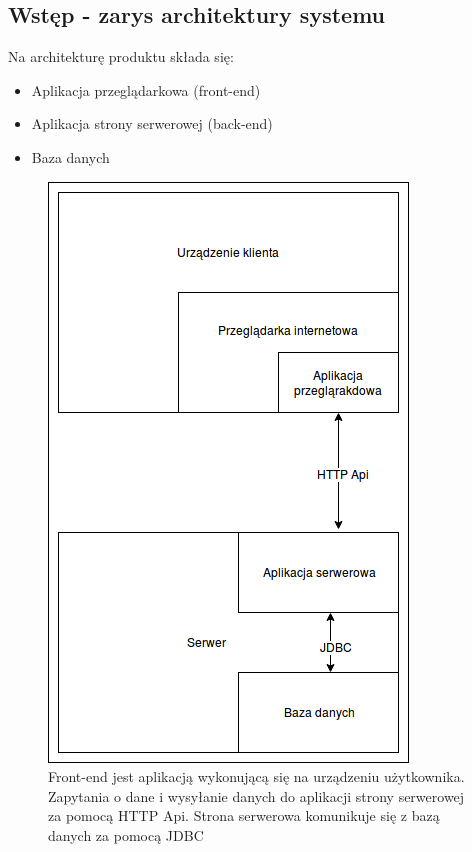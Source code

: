 \documentclass[polish,12pt]{aghthesis}
\begin{document}
\subsection{Wstęp - zarys architektury systemu}
Na architekturę produktu składa się:
\begin{itemize}
    \item Aplikacja przeglądarkowa (front-end)
    \item Aplikacja strony serwerowej (back-end)
    \item Baza danych
\end{itemize}


\begin{figure}[H]
    \centering
    \includegraphics{komunikacja-serwer-klient-okolny}
    \caption{Front-end jest aplikacją wykonującą się na urządzeniu użytkownika. Zapytania o dane i wysyłanie danych do aplikacji strony serwerowej za pomocą HTTP Api. Strona serwerowa komunikuje się z bazą danych za pomocą JDBC}
    \label{fig:my_label}
\end{figure}
\end{document}
